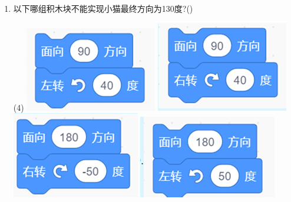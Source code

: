 \documentclass[10.5pt, a4paper]{article}
\begin{document}
\begin{enumerate}
        \item 以下哪组积木块不能实现小猫最终方向为130度?(\qquad)
        \begin{tasks}(4)
            \task \includegraphics[width=.12\textwidth]{4a.png}
            \task \includegraphics[width=.12\textwidth]{4b.png}
            \task \includegraphics[width=.12\textwidth]{4c.png}
            \task \includegraphics[width=.14\textwidth]{4d.png}
        \end{tasks}


\end{enumerate}
\end{document}
